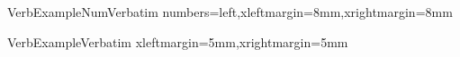 \newenvironment{enumzjr}{\begin{enumzjromai}}{\end{enumzjromai}}
\newenvironment{enumzjb}{\begin{enumzjbetu}}{\end{enumzjbetu}}


\renewcommand{\headrulewidth}{0.5pt}
\renewcommand{\footrulewidth}{0pt}

\pagestyle{fancy}
\fancyhf{}
\fancyhead[LE,RO]{\sffamily\thepage}%
\fancyhead[LO]{\sffamily\sc\nouppercase{\rightmark}}%
\fancyhead[RE]{\sffamily\sc\nouppercase{\leftmark}}%


\fancypagestyle{plain}{\fancyhf{}\renewcommand{\headrulewidth}{0pt}}

\renewcommand{\chaptermark}[1]{\markboth{\thechapter.\ \chaptername.\ \ #1}{}}
\renewcommand{\sectionmark}[1]{\markright{\thesection.\ #1}}

\makeatletter
\def\cleardoublepage{\clearpage\if@twoside \ifodd\c@page\else
\hbox{}
\thispagestyle{empty}
\newpage
\if@twocolumn\hbox{}\nepage\fi\fi\fi}
\makeatother


\clearpage{\thispagestyle{empty}\cleardoublepage}

\newenvironment{kode}{\begin{minipage}[b]{0.95\textwidth}\begin{alltt}\end{alltt}\end{minipage}}

\DefineVerbatimEnvironment%
{VerbExampleNum}{Verbatim}
{numbers=left,xleftmargin=8mm,xrightmargin=8mm}

\DefineVerbatimEnvironment%
{VerbExample}{Verbatim}
{xleftmargin=5mm,xrightmargin=5mm}

